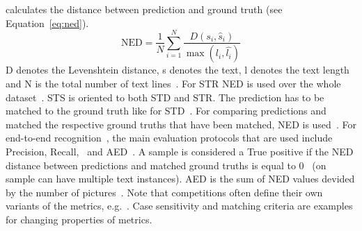 calculates the distance between prediction and ground truth (see Equation~\ref{eq:ned}).
\begin{equation}\label{eq:ned}
    \text{NED} = \frac{1}{N}\sum_{i=1}^N \frac{D(s_i,\hat{s}_i)}{\max(l_i,\hat{l_i})}
\end{equation}
D denotes the Levenshtein distance, s denotes the text, l denotes the text length and N is the total
number of text lines~\citep{shi_icdar2017_2017}.
For \ac{STR} \ac{NED} is used over the whole dataset~\citep{karatzas_icdar_2013}.
\ac{STS} is oriented to both \ac{STD} and \ac{STR}.
The prediction has to be matched to the ground truth like for \ac{STD}~\citep{long_scene_2021}.
For comparing predictions and matched the respective ground truths that have been matched, \ac{NED} is
used~\citep{chen_text_2021}.
For end-to-end recognition~\citep{karatzas_icdar_2013,karatzas_icdar_2015}, the main evaluation
protocols that are used include Precision, Recall, \fone\ and \ac{AED}~\citep{chen_text_2021}.
A sample is considered a True positive if the \ac{NED} distance between predictions and
matched ground truths is equal to 0~\citep{sun_icdar_2019} (on sample can have multiple text instances).
\ac{AED} is the sum of \ac{NED} values devided by the number of pictures~\citep{chen_text_2021}.
Note that competitions often define their own variants of the metrics,
e.g.~\cite{he_icpr2018_2018,shi_icdar2017_2017}.
Case sensitivity and matching criteria are examples for changing properties of metrics.

